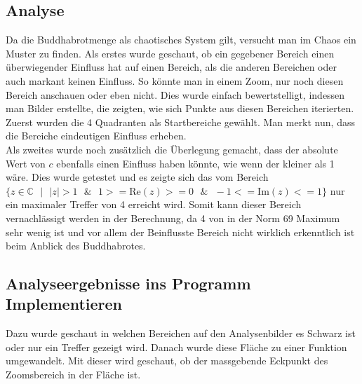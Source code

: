 \subsection{Analyse}
Da die Buddhabrotmenge als chaotisches System gilt, versucht man im Chaos ein Muster zu finden. Als erstes wurde geschaut, ob ein gegebener Bereich einen überwiegender Einfluss hat auf einen Bereich, als die anderen Bereichen oder auch markant keinen Einfluss. So könnte man in einem Zoom, nur noch diesen Bereich anschauen oder eben nicht. Dies wurde einfach bewertstelligt, indessen man Bilder erstellte, die zeigten, wie sich Punkte aus diesen Bereichen iterierten. Zuerst wurden die 4 Quadranten als Startbereiche gewählt. Man merkt nun, dass die Bereiche eindeutigen Einfluss erheben.
\\
Als zweites wurde noch zusätzlich die Überlegung gemacht, dass der absolute Wert von $c$ ebenfalls einen Einfluss haben könnte, wie wenn der kleiner als 1 wäre. Dies wurde getestet und es zeigte sich das vom Bereich $\{z \in \mathbb{C}\text{ }|\text{ } |z| >1\text{ } \& \text{ } 1>=\text{Re}(z)>=0 \text{ } \& \text{ }-1<=\text{Im}(z)<=1\}$ nur ein maximaler Treffer von 4 erreicht wird. Somit kann dieser Bereich vernachlässigt werden in der Berechnung, da 4 von in der Norm 69 Maximum sehr wenig ist und vor allem der Beinflusste Bereich nicht wirklich erkenntlich ist beim Anblick des Buddhabrotes.
\subsection{Analyseergebnisse ins Programm Implementieren}
Dazu wurde geschaut in welchen Bereichen auf den Analysenbilder es Schwarz ist oder nur ein Treffer gezeigt wird. Danach wurde diese Fläche zu einer Funktion umgewandelt. Mit dieser wird geschaut, ob der massgebende Eckpunkt des Zoomsbereich in der Fläche ist. 